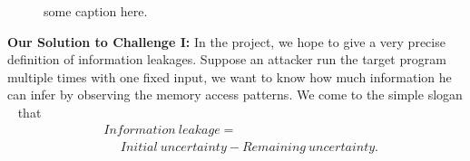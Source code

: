 \begin{figure}
\centering
{}
\caption{some caption here. }
\end{figure}

\textbf{Our Solution to Challenge I:}
In the project, we hope to give a very precise definition of information leakages. 
Suppose an attacker run the target program multiple times with one fixed input, we
want to know how much information he can infer by observing the memory access patterns.
We come to the simple slogan ~\cite{10.1007/978-3-642-00596-1_21} %
that
\begin{align*}
 & \mathit{Information\ leakage} = \\
 & ~~~~~~ \mathit{Initial}\ \mathit{uncertainty} - \mathit{Remaining\ uncertainty}. 
\end{align*}


